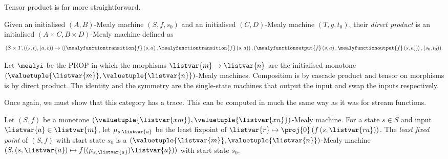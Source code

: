 Tensor product is far more straightforward.

\begin{definition}
    Given an initialised \((A,B)\)-Mealy machine \((S,f,s_0)\) and an
    initialised \((C,D)\)-Mealy machine \((T,g,t_0)\), their
    \emph{direct product} is an initialised \((A \times C,B \times D)\)-Mealy
    machine defined as \[
        (S \times T, \left((s, t), (a, c)\right) \mapsto \left\langle
        \left(
        \mealyfunctiontransition{f}\left(s, a\right),
        \mealyfunctiontransition{f}\left(s, a\right)
        \right),
        \left(
        \mealyfunctionoutput{f}\left(s, a\right),
        \mealyfunctionoutput{f}\left(s, a\right)
        \right)\right\rangle,
        (s_0, t_0)
        ).
    \]
\end{definition}

\begin{definition}
    Let \(\mealyi\) be the PROP in which the morphisms
    \(\listvar{m} \to \listvar{n}\) are the initialised monotone
    \((\valuetuple{\listvar{m}}, \valuetuple{\listvar{n}})\)-Mealy machines.
    Composition is by cascade product and tensor on morphisms is by
    direct product.
    The identity and the symmetry are the single-state machines that output the
    input and swap the inputs respectively.
\end{definition}

Once again, we must show that this category has a trace.
This can be computed in much the same way as it was for stream functions.

\begin{definition}
    Let \((S, f)\) be a monotone \(
    (\valuetuple{\listvar{xm}}, \valuetuple{\listvar{xn}})
    \)-Mealy machine.
    For a state \(s \in S\) and input \(\listvar{a} \in \listvar{m}\), let
    \(\mu_{s,\listvar{a}}\) be the least fixpoint of \(
    \listvar{r} \mapsto \proj{0}\left(f\left(s, \listvar{ra}\right)\right)
    \).
    The \emph{least fixed point} of \((S, f)\) with start state \(s_0\) is a \(
    (\valuetuple{\listvar{m}}, \valuetuple{\listvar{n}})
    \)-Mealy machine \(
    (S, (s, \listvar{a}) \mapsto f((\mu_{s,\listvar{a}})\listvar{a}))
    \) with start state \(s_0\).
\end{definition}

